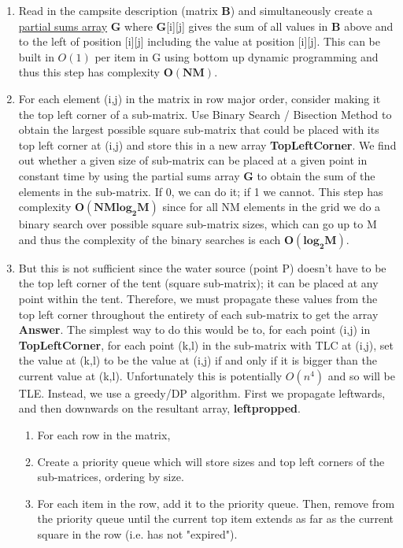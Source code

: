 \documentclass{article}
\begin{document}
\begin{enumerate}
    \item Read in the campsite description (matrix \textbf{B}) and simultaneously create a \href{https://www.geeksforgeeks.org/prefix-sum-2d-array/}{partial sums array} \textbf{G} where \textbf{G}[i][j] gives the sum of all values in \textbf{B} above and to the left of position [i][j] including the value at position [i][j]. This can be built in $O(1)$ per item in G using bottom up dynamic programming and thus this step has complexity $\mathbf{O(NM)}$.
    \item For each element (i,j) in the matrix in row major order, consider making it the top left corner of a sub-matrix. Use Binary Search / Bisection Method to obtain the largest possible square sub-matrix that could be placed with its top left corner at (i,j) and store this in a new array \textbf{TopLeftCorner}. We find out whether a given size of sub-matrix can be placed at a given point in constant time by using the partial sums array \textbf{G} to obtain the sum of the elements in the sub-matrix. If 0, we can do it; if 1 we cannot. This step has complexity $\mathbf{O(NMlog_2{M})}$ since for all NM elements in the grid we do a binary search over possible square sub-matrix sizes, which can go up to M and thus the complexity of the binary searches is each $\mathbf{O(log_2{M})}$.
    \item But this is not sufficient since the water source (point P) doesn't have to be the top left corner of the tent (square sub-matrix); it can be placed at any point within the tent. Therefore, we must propagate these values from the top left corner throughout the entirety of each sub-matrix to get the array \textbf{Answer}. The simplest way to do this would be to, for each point (i,j) in \textbf{TopLeftCorner}, for each point (k,l) in the sub-matrix with TLC at (i,j), set the value at (k,l) to be the value at (i,j) if and only if it is bigger than the current value at (k,l). Unfortunately this is potentially $O(n^4)$ and so will be TLE. Instead, we use a greedy/DP algorithm. First we propagate leftwards, and then downwards on the resultant array, \textbf{leftpropped}.
        \begin{enumerate}
            \item For each row in the matrix,
            \item Create a priority queue which will store sizes and top left corners of the sub-matrices, ordering by size.
            \item For each item in the row, add it to the priority queue. Then, remove from the priority queue until the current top item extends as far as the current square in the row (i.e. has not "expired").

\end{enumerate}
\end{enumerate}
\end{document}
